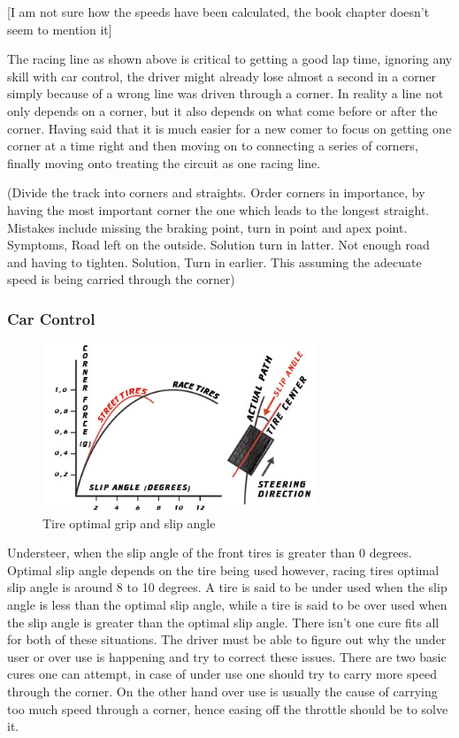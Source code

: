 \documentclass{article}
\begin{document}
{\color{red}[I am not sure how the speeds have been calculated, the book chapter doesn't seem to mention it]}

The racing line as shown above is critical to getting a good lap time, ignoring any skill with car control, the driver might already lose almost a second in a corner simply because of a wrong line was driven through a corner. In reality a line not only depends on a corner, but it also depends on what come before or after the corner. Having said that it is much easier for a new comer to focus on getting one corner at a time right and then moving on to connecting a series of corners, finally moving onto treating the circuit as one racing line\cite{beckman1991physics}\cite{GoingFaster}.

{\color{red}(Divide the track into corners and straights. Order corners in importance, by having the most important corner the one which leads to the longest straight. Mistakes include missing the braking point, turn in point and apex point. Symptoms, Road left on the outside. Solution turn in latter. Not enough road and having to tighten. Solution, Turn in earlier. This assuming the adecuate speed is being carried through the corner)}

\subsubsection{Car Control}

\begin{figure}[!htb]
	\centering
	\includegraphics[height=5cm]{slip_angle}
	\caption{Tire optimal grip and slip angle}
\label{fig:slip_angle}
\end{figure}

Understeer, when the slip angle of the front tires is greater than 0 degrees. Optimal slip angle depends on the tire being used however, racing tires optimal slip angle is around 8 to 10 degrees. A tire is said to be under used when the slip angle is less than the optimal slip angle, while a tire is said to be over used when the slip angle is greater than the optimal slip angle. There isn't one cure fits all for both of these situations. The driver must be able to figure out why the under user or over use is happening and try to correct these issues. There are two basic cures one can attempt, in case of under use one should try to carry more speed through the corner. On the other hand over use is usually the cause of carrying too much speed through a corner, hence easing off the throttle should be to solve it\cite{GoingFaster}.
\end{document}
